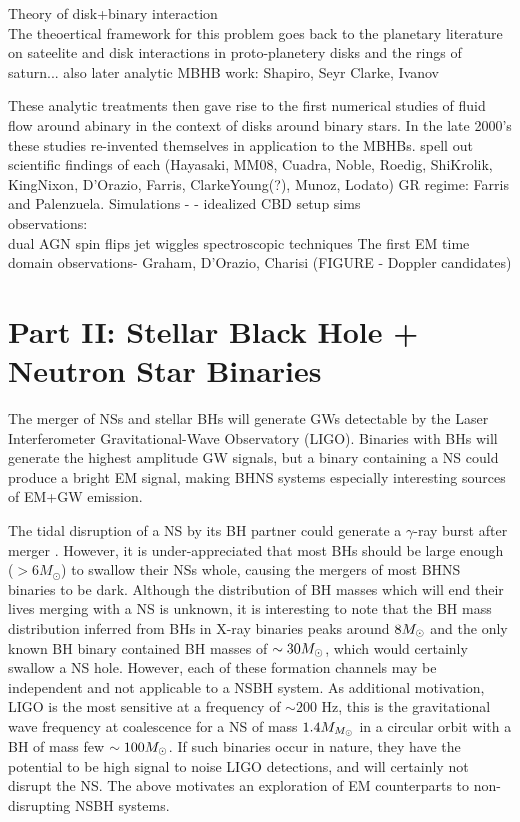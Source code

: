 Theory of disk+binary interaction\\
The theoertical framework for this problem goes back to the planetary literature on sateelite and disk interactions in proto-planetery disks and the rings of saturn...
also later analytic MBHB work: Shapiro, Seyr Clarke, Ivanov

These analytic treatments then gave rise to the first numerical studies of fluid flow around  abinary in the context of disks around binary stars. In the late 2000's these studies re-invented themselves in application to the MBHBs. spell out scientific findings of each (Hayasaki, MM08, Cuadra, Noble, Roedig, ShiKrolik, KingNixon, D'Orazio, Farris, ClarkeYoung(?), Munoz, Lodato)
GR regime: Farris and Palenzuela.
Simulations -  - idealized CBD setup sims\\


observations:\\
dual AGN
spin flips
jet wiggles
spectroscopic techniques
The first EM time domain observations- Graham, D'Orazio, Charisi 
(FIGURE - Doppler candidates)



\section{Part II: Stellar Black Hole + Neutron Star Binaries}
The merger of NSs and stellar BHs will generate GWs detectable by the Laser
Interferometer Gravitational-Wave Observatory (LIGO). Binaries with BHs will
generate the highest amplitude GW signals, but a binary containing a NS could
produce a bright EM signal, making BHNS systems especially interesting sources
of EM+GW emission.

The tidal disruption of a NS by its BH partner could generate a $\gamma$-ray
burst after merger \citep{NPP:NSBH_GRB:1992}. However, it is under-appreciated
that most BHs should be large enough ($> 6M_\odot $) to swallow their NSs
whole, causing the mergers of most BHNS binaries to be dark. 
Although the distribution of BH masses
which will end their lives merging with a NS is unknown, it is interesting to
note that the BH mass distribution inferred from BHs in X-ray binaries peaks
around $8 {M_{\odot}}$ \citep{Orzel:2008} and the only known BH binary contained BH
masses of $\sim 30 {M_{\odot}}$, which would certainly swallow a NS hole. However,
each of these formation channels may be independent and not applicable to a
NSBH system. As additional motivation, LIGO is the most sensitive at a
frequency of $\sim 200$ Hz, this is the gravitational wave frequency at
coalescence for a NS of mass $1.4 M_{{M_{\odot}}}$ in a circular orbit with a BH of
mass few $\sim100 {M_{\odot}}$. If such binaries occur in nature, they have the
potential to be high signal to noise LIGO detections, and will certainly not
disrupt the NS. The above motivates an exploration of EM counterparts to non-
disrupting NSBH systems.



